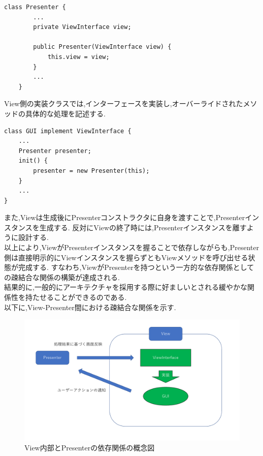 \documentclass[12pt]{jarticle}
\begin{document}
\begin{lstlisting}[caption=PresenterにおけるViewInterface型インスタンスの生成, label=mid]
    class Presenter {
        ...
        private ViewInterface view;

        public Presenter(ViewInterface view) {
            this.view = view;
        }
        ...
    }
\end{lstlisting}
View側の実装クラスでは,インターフェースを実装し,オーバーライドされたメソッドの具体的な処理を記述する.
\begin{lstlisting}[caption=GUIにおけるPresenterインスタンス生成, label=mid]
    class GUI implement ViewInterface {
    ...
    Presenter presenter;
    init() {
        presenter = new Presenter(this);
    }
    ...
}
\end{lstlisting}
また,Viewは生成後にPresenterコンストラクタに自身を渡すことで,Presenterインスタンスを生成する.
反対にViewの終了時には,Presenterインスタンスを離すように設計する. \\

以上により,ViewがPresenterインスタンスを握ることで依存しながらも,Presenter側は直接明示的にViewインスタンスを握らずともViewメソッドを呼び出せる状態が完成する.
すなわち,ViewがPresenterを持つという一方的な依存関係としての疎結合な関係の構築が達成される. \\
結果的に,一般的にアーキテクチャを採用する際に好ましいとされる緩やかな関係性を持たせることができるのである. \\
以下に,View-Presenter間における疎結合な関係を示す.
\begin{figure}[!hbt]
    \centering
    \includegraphics[scale=0.35]{images/view.pdf}
    \caption{View内部とPresenterの依存関係の概念図}
\end{figure}

\newpage
\end{document}
